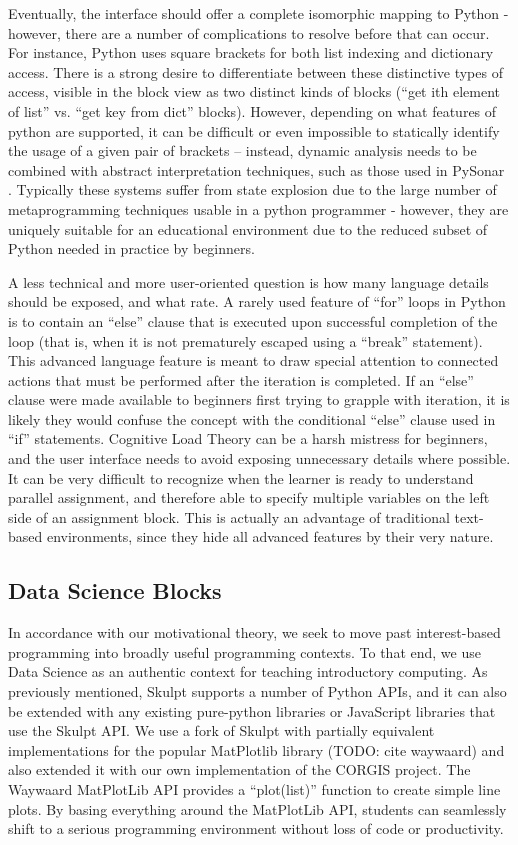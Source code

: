 \documentclass{sig-alternate}
\begin{document}
Eventually, the interface should offer a complete isomorphic mapping to Python - however, there are a number of complications to resolve before that can occur.
For instance, Python uses square brackets for both list indexing and dictionary access.
There is a strong desire to differentiate between these distinctive types of access, visible in the block view as two distinct kinds of blocks (``get ith element of list'' vs. ``get key from dict'' blocks).
However, depending on what features of python are supported, it can be difficult or even impossible to statically identify the usage of a given pair of brackets -- instead, dynamic analysis needs to be combined with abstract interpretation techniques, such as those used in PySonar .  %
Typically these systems suffer from state explosion due to the large number of metaprogramming techniques usable in a python programmer - however, they are uniquely suitable for an educational environment due to the reduced subset of Python needed in practice by beginners.

A less technical and more user-oriented question is how many language details should be exposed, and what rate.
A rarely used feature of ``for'' loops in Python is to contain an ``else'' clause that is executed upon successful completion of the loop (that is, when it is not prematurely escaped using a ``break'' statement).
This advanced language feature is meant to draw special attention to connected actions that must be performed after the iteration is completed.
If an ``else'' clause were made available to beginners first trying to grapple with iteration, it is likely they would confuse the concept with the conditional ``else'' clause used in ``if'' statements.
Cognitive Load Theory can be a harsh mistress for beginners, and the user interface needs to avoid exposing unnecessary details where possible.
It can be very difficult to recognize when the learner is ready to understand parallel assignment, and therefore able to specify multiple variables on the left side of an assignment block.
This is actually an advantage of traditional text-based environments, since they hide all advanced features by their very nature.
	
\subsection{Data Science Blocks}

In accordance with our motivational theory, we seek to move past interest-based programming into broadly useful programming contexts.
To that end, we use Data Science as an authentic context for teaching introductory computing.
As previously mentioned, Skulpt supports a number of Python APIs, and it can also be extended with any existing pure-python libraries or JavaScript libraries that use the Skulpt API.
We use a fork of Skulpt with partially equivalent implementations for the popular MatPlotlib library (TODO: cite waywaard) and also extended it with our own implementation of the CORGIS project.
The Waywaard MatPlotLib API provides a ``plot(list)'' function to create simple line plots.
By basing everything around the MatPlotLib API, students can seamlessly shift to a serious programming environment without loss of code or productivity. 
\end{document}
